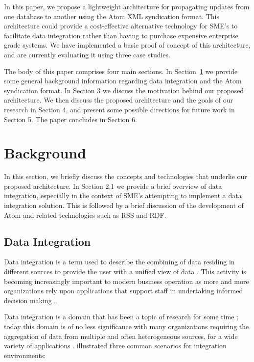 \documentclass{CRPITStyle}
\begin{document}
In this paper, we propose a lightweight architecture for propagating
updates from one database to another using the Atom XML syndication
format. This architecture could provide a cost-effective alternative
technology for SME's to facilitate data integration rather than having
to purchase expensive enterprise grade systems. We have implemented a
basic proof of concept of this architecture, and are currently
evaluating it using three case studies.

The body of this paper comprises four main sections. In
Section~\ref{sec-background} we provide some general background
information regarding data integration and the Atom syndication format.
In Section 3 we discuss the motivation behind our proposed architecture.
We then discuss the proposed architecture and the goals of our research
in Section 4, and present some possible directions for future work in
Section 5. The paper concludes in Section 6.


\section{Background}
\label{sec-background}

In this section, we briefly discuss the concepts and technologies that
underlie our proposed architecture. In Section 2.1 we provide a brief
overview of data integration, especially in the context of SME's
attempting to implement a data integration solution. This is followed by
a brief discussion of the development of Atom and related technologies
such as RSS and RDF.


\subsection{Data Integration}
\label{sec-data-integration}

Data integration is a term used to describe the combining of data
residing in different sources to provide the user with a unified view of
data \cite{Bati-C-1986,Yu-C-2004-SIGMOD}. This activity is becoming
increasingly important to modern business operation as more and more
organizations rely upon applications that support staff in undertaking
informed decision making \cite{Calv-D-1998-CoopIS,Yu-C-2004-SIGMOD}.

Data integration is a domain that has been a topic of research for some
time \cite{Beck-R-2002-Bled,Wied-G-1993-SIGMOD}; today this domain is of
no less significance with many organizations requiring the aggregation
of data from multiple and often heterogeneous sources, for a wide
variety of applications \cite{Haas-LM-1999-DEB}.
 illustrated three common scenarios for
integration environments:
\end{document}
